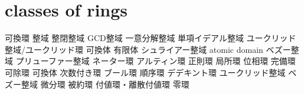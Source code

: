 \section{classes of rings}
可換環
整域
整閉整域
GCD整域
一意分解整域
単項イデアル整域
ユークリッド整域/ユークリッド環
可換体
有限体
シュライアー整域
atomic domain
ベズー整域
プリューファー整域
ネーター環
アルティン環
正則環
局所環
位相環
完備環
可除環
可換体
次数付き環
ブール環
順序環
デデキント環
ユークリッド整域
ベズー整域
微分環
被約環
付値環・離散付値環
零環

